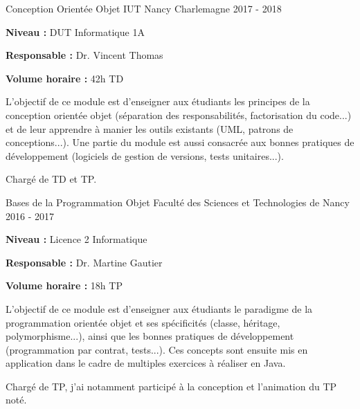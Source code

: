 \documentclass[12pt, a4paper]{awesome-cv}
\begin{document}
\begin{cventries}
  \cventry
  {Conception Orientée Objet} %
  {IUT Nancy Charlemagne} %
  {} %
  {2017 - 2018} %
  {
    \begin{cvitems}
      \item {\textbf{Niveau : } DUT Informatique 1A}
      \item {\textbf{Responsable : } Dr. Vincent Thomas}
      \item {\textbf{Volume horaire : } 42h TD}
    \end{cvitems}
  }

  \begin{cvparagraph}
    L'objectif de ce module est d'enseigner aux étudiants les principes de la conception orientée objet (séparation des responsabilités, factorisation du code...) et de leur apprendre à manier les outils existants (UML, patrons de conceptions...).
    Une partie du module est aussi consacrée aux bonnes pratiques de développement (logiciels de gestion de versions, tests unitaires...).
  \end{cvparagraph}

  \begin{cvparagraph}
    Chargé de TD et TP.
  \end{cvparagraph}

  \cventry
  {Bases de la Programmation Objet} %
  {Faculté des Sciences et Technologies de Nancy} %
  {} %
  {2016 - 2017} %
  {
    \begin{cvitems}
      \item {\textbf{Niveau : } Licence 2 Informatique}
      \item {\textbf{Responsable : } Dr. Martine Gautier}
      \item {\textbf{Volume horaire : } 18h TP}
    \end{cvitems}
  }

  \begin{cvparagraph}
    L'objectif de ce module est d'enseigner aux étudiants le paradigme de la programmation orientée objet et ses spécificités (classe, héritage, polymorphisme...), ainsi que les bonnes pratiques de développement (programmation par contrat, tests...).
    Ces concepts sont ensuite mis en application dans le cadre de multiples exercices à réaliser en Java.
  \end{cvparagraph}

  \begin{cvparagraph}
    Chargé de TP, j'ai notamment participé à la conception et l'animation du TP noté.
  \end{cvparagraph}


\end{cventries}
\end{document}
